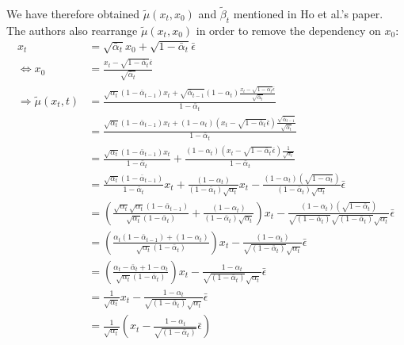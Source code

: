 \documentclass{article}
\begin{document}
{
\allowdisplaybreaks \\
We have therefore obtained $\tilde{\mu}(x_t, x_0)$ and $\tilde{\beta}_t$ mentioned in Ho et al.'s \cite{ho2020denoising} paper. \\
The authors also rearrange $\tilde{\mu}(x_t, x_0)$ in order to remove the dependency on $x_0$: \\
  \begin{align}
    x_t &= \sqrt{\bar{\alpha}_t} x_0 + \sqrt{1 - \bar{\alpha}_t} \bar{\epsilon} \\
    \Leftrightarrow x_0 &= \frac{x_t - \sqrt{1 - \bar{\alpha}_t} \bar{\epsilon}}{\sqrt{\bar{\alpha}_t}} \\
    \Rightarrow \tilde{\mu}(x_t, t) &= \frac{\sqrt{\alpha_t}(1 - \bar{\alpha}_{t-1}) x_t + \sqrt{\bar{\alpha}_{t-1}}(1 - \alpha_t) \frac{x_t - \sqrt{1 - \bar{\alpha}_t} \bar{\epsilon}}{\sqrt{\bar{\alpha}_t}}}{1 - \bar{\alpha}_t} \\
    &= \frac{\sqrt{\alpha_t}(1 - \bar{\alpha}_{t-1}) x_t + (1 - \alpha_t) \left(x_t - \sqrt{1 - \bar{\alpha}_t} \bar{\epsilon} \right) \frac{\sqrt{\bar{\alpha}_{t-1}}}{\sqrt{\bar{\alpha}_t}}}{1 - \bar{\alpha}_t} \\
    &= \frac{\sqrt{\alpha_t}(1 - \bar{\alpha}_{t-1}) x_t}{{1 - \bar{\alpha}_t}} + \frac{(1 - \alpha_t) \left(x_t - \sqrt{1 - \bar{\alpha}_t} \bar{\epsilon} \right) \frac{1}{\sqrt{\alpha_t}}}{1 - \bar{\alpha}_t} \\
    &= \frac{\sqrt{\alpha_t}(1 - \bar{\alpha}_{t-1})}{{1 - \bar{\alpha}_t}} x_t + \frac{(1 - \alpha_t)}{(1 - \bar{\alpha}_t) \sqrt{\alpha_t}} x_t - \frac{(1 - \alpha_t)(\sqrt{1 - \bar{\alpha}_t})}{(1 - \bar{\alpha}_t)\sqrt{\alpha_t}} \bar{\epsilon} \\
    &= \left( \frac{\sqrt{\alpha_t} \sqrt{\alpha_t}(1 - \bar{\alpha}_{t-1})}{\sqrt{\alpha_t} ({1 - \bar{\alpha}_t})}+ \frac{(1 - \alpha_t)}{(1 - \bar{\alpha}_t) \sqrt{\alpha_t}} \right) x_t - \frac{(1 - \alpha_t)(\sqrt{1 - \bar{\alpha}_t})}{\sqrt{(1 - \bar{\alpha}_t)}\sqrt{(1 - \bar{\alpha}_t)}\sqrt{\alpha_t}} \bar{\epsilon} \\
    &= \left( \frac{\alpha_t (1 - \bar{\alpha}_{t-1}) + (1 - \alpha_t)}{\sqrt{\alpha_t} ({1 - \bar{\alpha}_t})} \right) x_t - \frac{(1 - \alpha_t)}{\sqrt{(1 - \bar{\alpha}_t)}\sqrt{\alpha_t}} \bar{\epsilon} \\
    &= \left( \frac{\alpha_t - \bar{\alpha}_{t} + 1 - \alpha_t}{\sqrt{\alpha_t} ({1 - \bar{\alpha}_t})} \right) x_t - \frac{1 - \alpha_t}{\sqrt{(1 - \bar{\alpha}_t)}\sqrt{\alpha_t}} \bar{\epsilon} \\
    &= \frac{1}{\sqrt{\alpha_t}} x_t - \frac{1 - \alpha_t}{\sqrt{(1 - \bar{\alpha}_t)}\sqrt{\alpha_t}} \bar{\epsilon} \\
    &= \frac{1}{\sqrt{\alpha_t}} \left( x_t - \frac{1 - \alpha_t}{\sqrt{(1 - \bar{\alpha}_t)}} \bar{\epsilon} \right)
  \end{align}
}
\end{document}
